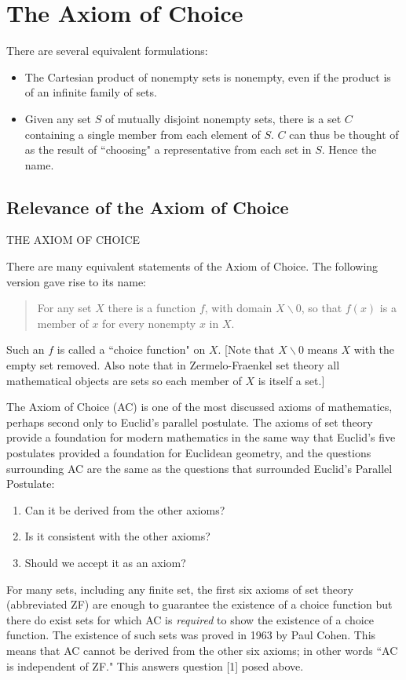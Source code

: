 \section{The Axiom of Choice}


 There are several equivalent formulations:

\begin{itemize}

    \item The Cartesian product of nonempty sets is nonempty, even
    if the product is of an infinite family of sets.

    \item Given any set $S$ of mutually disjoint nonempty sets, there is a set $C$
    containing a single member from each element of $S$.  $C$ can thus be
    thought of as the result of ``choosing" a representative from each
    set in $S$. Hence the name.
\end{itemize}

\subsection{Relevance of the Axiom of Choice}
THE AXIOM OF CHOICE

There are many equivalent statements of the Axiom of Choice.  The following
version gave rise to its name:
\begin{quote}
  For any set $X$ there is a function $f$, with domain
  $X\backslash{0}$, so that $f(x)$ is a member of $x$ for every
  nonempty $x$ in $X$.
\end{quote}
Such an $f$ is called a ``choice function" on $X$.  [Note that $X\backslash
 {0}$ means
$X$ with the empty set removed.  Also note that in Zermelo-Fraenkel set
theory all mathematical objects are sets so each member of $X$ is itself
a set.]

The Axiom of Choice (AC) is one of the most discussed axioms of mathematics,
perhaps second only to Euclid's parallel postulate.  The axioms of set theory
provide a foundation for modern mathematics in the same way that Euclid's five
postulates provided a foundation for Euclidean geometry, and the questions
surrounding AC are the same as the questions that surrounded Euclid's Parallel
Postulate:
\begin{enumerate}
 \item  Can it be derived from the other axioms?
 \item Is it consistent with the other axioms?
 \item Should we accept it as an axiom?
\end{enumerate}
For many sets, including any finite set, the first six axioms of set theory
(abbreviated ZF) are enough to guarantee the existence of a choice function
but there do exist sets for which AC is {\em required} to show the existence of
a choice function.  The existence of such sets was proved in 1963 by Paul
Cohen.  This means that AC cannot be derived from the other six axioms;
in other words ``AC is independent of ZF."  This answers question [1] posed
above.

